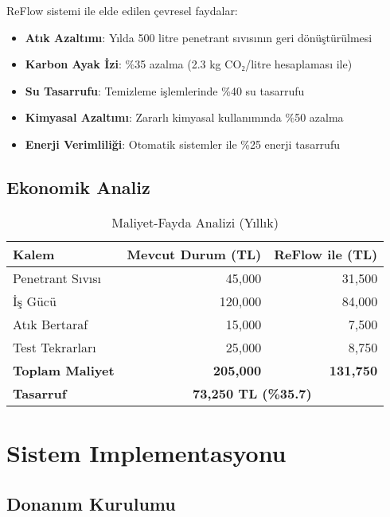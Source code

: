 \documentclass[12pt,a4paper]{article}
\begin{document}
ReFlow sistemi ile elde edilen çevresel faydalar:

\begin{itemize}
    \item \textbf{Atık Azaltımı}: Yılda 500 litre penetrant sıvısının geri dönüştürülmesi
    \item \textbf{Karbon Ayak İzi}: \%35 azalma (2.3 kg CO₂/litre hesaplaması ile)
    \item \textbf{Su Tasarrufu}: Temizleme işlemlerinde \%40 su tasarrufu
    \item \textbf{Kimyasal Azaltımı}: Zararlı kimyasal kullanımında \%50 azalma
    \item \textbf{Enerji Verimliliği}: Otomatik sistemler ile \%25 enerji tasarrufu
\end{itemize}

\subsection{Ekonomik Analiz}

\begin{table}[H]
    \centering
    \caption{Maliyet-Fayda Analizi (Yıllık)}
    \begin{tabular}{lrr}
        \toprule
        \textbf{Kalem} & \textbf{Mevcut Durum (TL)} & \textbf{ReFlow ile (TL)} \\
        \midrule
        Penetrant Sıvısı & 45,000 & 31,500 \\
        İş Gücü & 120,000 & 84,000 \\
        Atık Bertaraf & 15,000 & 7,500 \\
        Test Tekrarları & 25,000 & 8,750 \\
        \midrule
        \textbf{Toplam Maliyet} & \textbf{205,000} & \textbf{131,750} \\
        \textbf{Tasarruf} & \multicolumn{2}{c}{\textbf{73,250 TL (\%35.7)}} \\
        \bottomrule
    \end{tabular}
    \label{tab:cost_analysis}
\end{table}

\section{Sistem Implementasyonu}

\subsection{Donanım Kurulumu}
\end{document}
